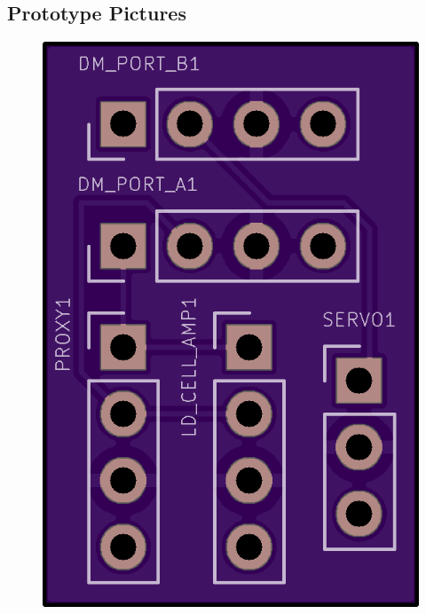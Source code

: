 \documentclass[12pt]{article}
\begin{document}
\subsection{Prototype Pictures}
\begin{figure}[H]
    \centering
    \includegraphics[height=0.5\textheight]{board-front.png}

\end{figure}
\end{document}

